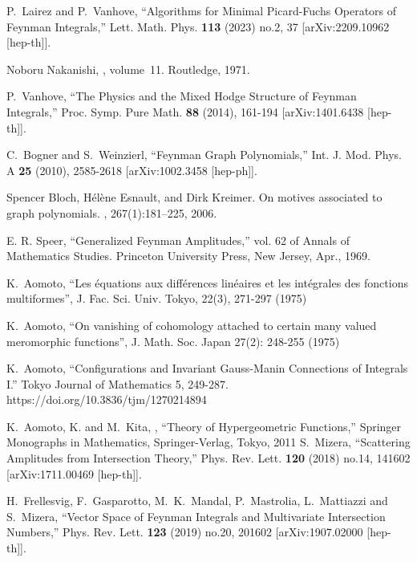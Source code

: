 \documentclass[a4paper,12pt]{article}
\numberwithin{equation}{section}
\numberwithin{figure}{section}
\begin{document}
\begin{thebibliography}{99}
P.~Lairez and P.~Vanhove,
``Algorithms for Minimal Picard-Fuchs Operators of Feynman Integrals,''
Lett. Math. Phys. \textbf{113} (2023) no.2, 37
[arXiv:2209.10962 [hep-th]].



Noboru Nakanishi,
, volume~11.
\newblock Routledge, 1971.

  
P.~Vanhove,
``The Physics and the Mixed Hodge Structure of Feynman Integrals,''
Proc. Symp. Pure Math. \textbf{88} (2014), 161-194
[arXiv:1401.6438 [hep-th]].


C.~Bogner and S.~Weinzierl,
``Feynman Graph Polynomials,''
Int. J. Mod. Phys. A \textbf{25} (2010), 2585-2618
[arXiv:1002.3458 [hep-ph]].

  
Spencer Bloch, H{\'e}l{\`e}ne Esnault, and Dirk Kreimer.
\newblock On motives associated to graph polynomials.
,
267(1):181--225, 2006.

  E. R. Speer, ``Generalized Feynman Amplitudes,'' vol. 62 of Annals of Mathematics Studies. Princeton University Press, New Jersey, Apr., 1969.
  


    K.~Aomoto, ``Les \'equations aux diff\'erences
     lin\'eaires et les int\'egrales des fonctions multiformes'',
     J. Fac. Sci. Univ. Tokyo, 22(3), 271-297  (1975)

   K.~Aomoto, ``On vanishing of cohomology attached to
    certain many valued meromorphic functions'', J. Math. Soc. Japan
    27(2): 248-255 (1975)

  
  K.~Aomoto, ``Configurations and Invariant Gauss-Manin Connections of Integrals I.'' Tokyo Journal of Mathematics 5, 249-287. https://doi.org/10.3836/tjm/1270214894

     K.~Aomoto, K. and M.~Kita, , ``Theory of Hypergeometric Functions,'' Springer Monographs in Mathematics, Springer-Verlag, Tokyo, 2011
S.~Mizera,
``Scattering Amplitudes from Intersection Theory,''
Phys. Rev. Lett. \textbf{120} (2018) no.14, 141602
[arXiv:1711.00469 [hep-th]].

H.~Frellesvig, F.~Gasparotto, M.~K.~Mandal, P.~Mastrolia, L.~Mattiazzi and S.~Mizera,
``Vector Space of Feynman Integrals and Multivariate Intersection Numbers,''
Phys. Rev. Lett. \textbf{123} (2019) no.20, 201602
[arXiv:1907.02000 [hep-th]].
    

\end{thebibliography}
\end{document}

